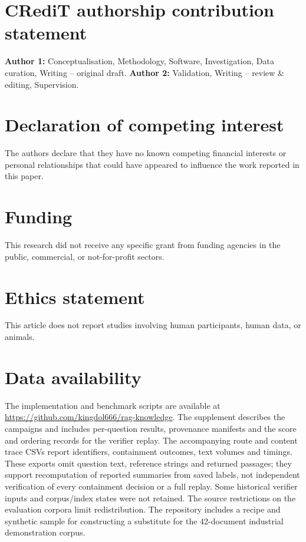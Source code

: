 
\section*{CRediT authorship contribution statement}
\textbf{Author 1:} Conceptualisation, Methodology, Software, Investigation,
Data curation, Writing -- original draft. \textbf{Author 2:} Validation,
Writing -- review \& editing, Supervision. %

\section*{Declaration of competing interest}
The authors declare that they have no known competing financial interests
or personal relationships that could have appeared to influence the work
reported in this paper.

\section*{Funding}
This research did not receive any specific grant from funding agencies in
the public, commercial, or not-for-profit sectors. %

\section*{Ethics statement}
This article does not report studies involving human participants, human
data, or animals.

\section*{Data availability}
The implementation and benchmark scripts are available at
\url{https://github.com/kingdol666/rag-knowledge}. The supplement describes
the campaigns and includes per-question results, provenance manifests and
the score and ordering records for the verifier replay. The accompanying
route and content trace CSVs report identifiers, containment outcomes, text
volumes and timings. These exports omit question text, reference strings and
returned passages; they support recomputation of reported summaries from saved
labels, not independent verification of every containment decision or a full
replay. Some historical verifier inputs and corpus/index states were not
retained. The source restrictions on the evaluation corpora limit
redistribution. The repository includes a recipe and synthetic sample for
constructing a substitute for the 42-document industrial demonstration
corpus.

